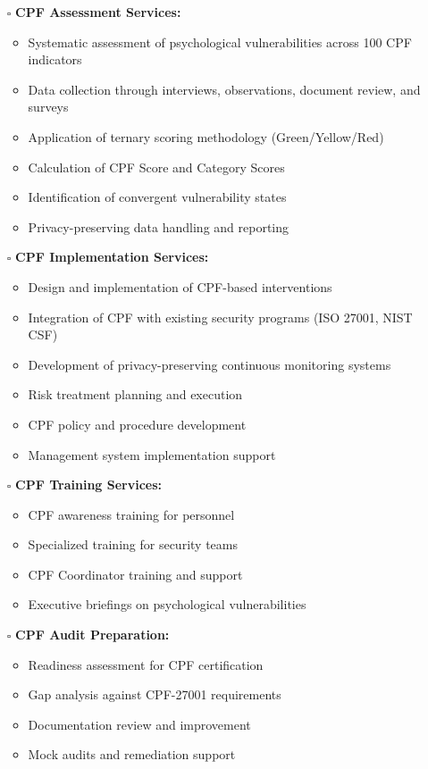 \documentclass[11pt,a4paper]{article}
\begin{document}
\begin{itemize}
\item[$\square$] \textbf{CPF Assessment Services:}
\begin{itemize}
\item Systematic assessment of psychological vulnerabilities across 100 CPF indicators
\item Data collection through interviews, observations, document review, and surveys
\item Application of ternary scoring methodology (Green/Yellow/Red)
\item Calculation of CPF Score and Category Scores
\item Identification of convergent vulnerability states
\item Privacy-preserving data handling and reporting
\end{itemize}

\item[$\square$] \textbf{CPF Implementation Services:}
\begin{itemize}
\item Design and implementation of CPF-based interventions
\item Integration of CPF with existing security programs (ISO 27001, NIST CSF)
\item Development of privacy-preserving continuous monitoring systems
\item Risk treatment planning and execution
\item CPF policy and procedure development
\item Management system implementation support
\end{itemize}

\item[$\square$] \textbf{CPF Training Services:}
\begin{itemize}
\item CPF awareness training for personnel
\item Specialized training for security teams
\item CPF Coordinator training and support
\item Executive briefings on psychological vulnerabilities
\end{itemize}

\item[$\square$] \textbf{CPF Audit Preparation:}
\begin{itemize}
\item Readiness assessment for CPF certification
\item Gap analysis against CPF-27001 requirements
\item Documentation review and improvement
\item Mock audits and remediation support
\end{itemize}


\end{itemize}
\end{document}
